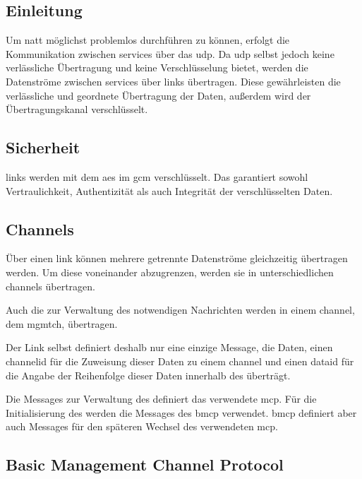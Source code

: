 
\label{dcl-link}

\subsection{Einleitung}
Um \gls{natt} möglichst problemlos durchführen zu können, erfolgt die
Kommunikation zwischen \glspl{service} über das \gls{udp}.
Da \gls{udp} selbst jedoch keine verlässliche Übertragung und keine
Verschlüsselung bietet, werden die Datenströme zwischen \glspl{service} über
\glspl{link} übertragen.
Diese gewährleisten die verlässliche und geordnete Übertragung der Daten,
außerdem wird der Übertragungskanal verschlüsselt.

\subsection{Sicherheit}
\Glspl{link} werden mit dem \gls{aes} im \gls{gcm} verschlüsselt.
Das garantiert sowohl Vertraulichkeit, Authentizität als auch Integrität der
verschlüsselten Daten.

\subsection{Channels}
\label{dcl-link-channels}
Über einen \gls{link} können mehrere getrennte Datenströme gleichzeitig
übertragen werden. Um diese voneinander abzugrenzen, werden sie in
unterschiedlichen \glspl{channel} übertragen.

Auch die zur Verwaltung des  notwendigen Nachrichten
werden in einem \gls{channel}, dem \gls{mgmtch}, übertragen.

Der Link selbst definiert deshalb nur eine einzige Message, die Daten, einen
\gls{channelid} für die Zuweisung dieser Daten zu einem \gls{channel} und einen
\gls{dataid} für die Angabe der Reihenfolge dieser Daten innerhalb des
 überträgt.

Die Messages zur Verwaltung des  definiert das verwendete
\gls{mcp}.
Für die Initialisierung des  werden die Messages des
\gls{bmcp} verwendet.
\gls{bmcp} definiert aber auch Messages für den späteren Wechsel des verwendeten
\gls{mcp}.

\subsection{Basic Management Channel Protocol}
\label{dcl-link-bmcp}

